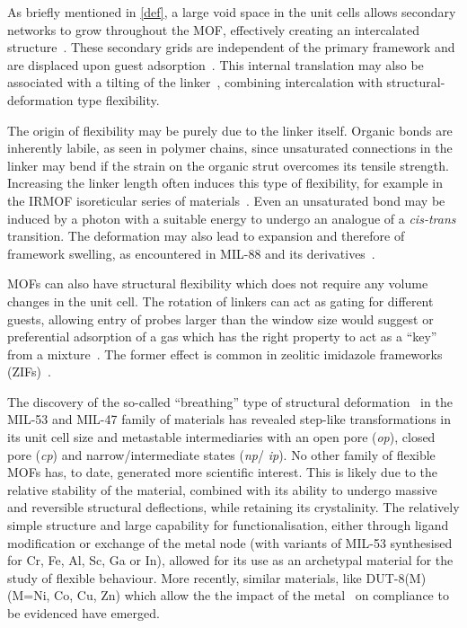As briefly mentioned in \autoref{def}, a large void 
space in the unit cells allows secondary networks 
to grow throughout the MOF, effectively creating an 
intercalated structure~\cite{kepertVersatileFamilyInterconvertible2000,%
kitauraPorousCoordinationPolymerCrystals2003}. 
These secondary grids are independent
of the primary framework and are displaced upon guest 
adsorption~\cite{majiFlexibleInterpenetratingCoordination2007}. 
This internal translation may also be associated 
with a tilting of the 
linker~\cite{sakataShapeMemoryNanoporesInduced2013},
combining intercalation with structural-deformation type 
flexibility.

The origin of flexibility may be purely due to the linker 
itself. Organic bonds are inherently labile, as seen in 
polymer chains, since unsaturated connections in the linker may
bend if the strain on the organic strut overcomes its tensile 
strength. Increasing the linker length often induces this 
type of flexibility, for example in the IRMOF isoreticular series
of materials~\cite{nelsonSupercriticalProcessingRoute2009}.
Even an unsaturated bond may be induced by a photon with a 
suitable energy to undergo an analogue of a \textit{cis-trans}
transition. The deformation may also lead to expansion and 
therefore of framework swelling,
as encountered in MIL-88 and its
derivatives~\cite{maIronBasedMetalOrganic2013}.

MOFs can also have structural flexibility which does not
require any volume changes in the unit cell. The rotation of linkers
can act as gating for different guests, allowing entry of probes
larger than the window size would suggest or preferential adsorption
of a gas which has the right property to act as a ``key'' from 
a mixture~\cite{seoPillaredLayerCoordinationPolymer2009}. 
The former effect is common in zeolitic imidazole frameworks 
(ZIFs)~\cite{fairen-jimenezOpeningGateFramework2011}.

The discovery of the so-called ``breathing'' type of structural
deformation~\cite{loiseauRationaleLargeBreathing2004, %
bourrellyDifferentAdsorptionBehaviors2005, %
    serreExplanationVeryLarge2007} in the MIL-53 and MIL-47 family of
materials has revealed step-like transformations in its unit cell
size and metastable intermediaries with an open pore (\textit{op}), 
closed pore (\textit{cp}) and narrow/intermediate states (\textit{np}/
\textit{ip}).
No other family of flexible MOFs has, to date, generated
more scientific interest. This is likely due to the relative 
stability of the material, combined with its ability to undergo massive 
and reversible structural deflections, while retaining its 
crystalinity. The relatively simple structure and large capability 
for functionalisation, either through ligand modification or exchange
of the metal node (with variants of MIL-53 synthesised for Cr, Fe, Al,
Sc, Ga or In), allowed for its use as an archetypal material 
for the study of flexible behaviour. More recently, similar 
materials, like DUT-8(M) (M=Ni, Co, Cu, Zn) which allow the the 
impact of the 
metal~\cite{kleinStructuralFlexibilityIntrinsic2012} on
compliance to be evidenced have emerged.

